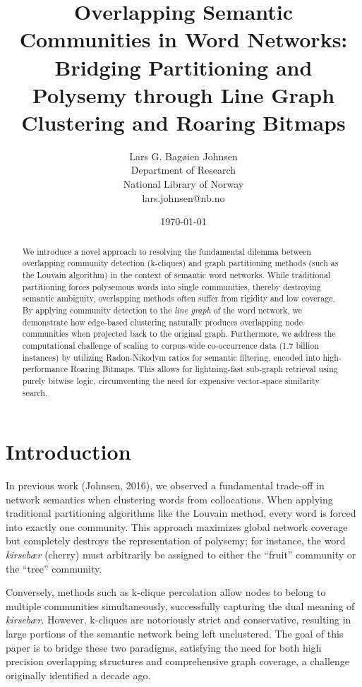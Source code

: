 \documentclass[11pt, a4paper]{article}
\title{Overlapping Semantic Communities in Word Networks:\\Bridging Partitioning and Polysemy through Line Graph Clustering and Roaring Bitmaps}
\author{Lars G. Bagøien Johnsen \\ Department of Research \\ National Library of Norway \\ lars.johnsen@nb.no}
\date{\today}
\begin{document}
\maketitle

\begin{abstract}
We introduce a novel approach to resolving the fundamental dilemma between overlapping community detection (k-cliques) and graph partitioning methods (such as the Louvain algorithm) in the context of semantic word networks. While traditional partitioning forces polysemous words into single communities, thereby destroying semantic ambiguity, overlapping methods often suffer from rigidity and low coverage. By applying community detection to the \textit{line graph} of the word network, we demonstrate how edge-based clustering naturally produces overlapping node communities when projected back to the original graph. Furthermore, we address the computational challenge of scaling to corpus-wide co-occurrence data (1.7 billion instances) by utilizing Radon-Nikodym ratios for semantic filtering, encoded into high-performance Roaring Bitmaps. This allows for lightning-fast sub-graph retrieval using purely bitwise logic, circumventing the need for expensive vector-space similarity search.
\end{abstract}

\section{Introduction}
In previous work (Johnsen, 2016), we observed a fundamental trade-off in network semantics when clustering words from collocations. When applying traditional partitioning algorithms like the Louvain method, every word is forced into exactly one community. This approach maximizes global network coverage but completely destroys the representation of polysemy; for instance, the word \textit{kirsebær} (cherry) must arbitrarily be assigned to either the ``fruit'' community or the ``tree'' community. 

Conversely, methods such as k-clique percolation allow nodes to belong to multiple communities simultaneously, successfully capturing the dual meaning of \textit{kirsebær}. However, k-cliques are notoriously strict and conservative, resulting in large portions of the semantic network being left unclustered. The goal of this paper is to bridge these two paradigms, satisfying the need for both high precision overlapping structures and comprehensive graph coverage, a challenge originally identified a decade ago.
\end{document}
